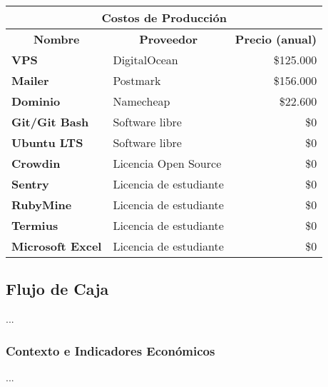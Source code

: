 \begin{center}
	\begin{tabular}{ | l | p{5cm} | p{5cm}|}
		\hline
		\multicolumn{3}{|c|}{\textbf{Costos de Producción}} \\
		\hline
		\multicolumn{1}{|c|}{\textbf{Nombre}} & \multicolumn{1}{|c|}{\textbf{Proveedor}} & \multicolumn{1}{|c|}{\textbf{Precio (anual)}} \\
		\hline
		{\textbf{VPS}} & DigitalOcean & \multicolumn{1}{|r|}{\$125.000} \\ \hline
		
		{\textbf{Mailer}} & Postmark & \multicolumn{1}{|r|}{\$156.000} \\ \hline
		
		{\textbf{Dominio}} & Namecheap & \multicolumn{1}{|r|}{\$22.600} \\ \hline
    
		{\textbf{Git/Git Bash}} & Software libre & \multicolumn{1}{|r|}{\$0} \\ \hline
		
		{\textbf{Ubuntu LTS}} & Software libre & \multicolumn{1}{|r|}{\$0} \\ \hline
    
    	{\textbf{Crowdin}} & Licencia Open Source & \multicolumn{1}{|r|}{\$0} \\ \hline
    
    	{\textbf{Sentry}} & Licencia de estudiante & \multicolumn{1}{|r|}{\$0} \\ \hline

		{\textbf{RubyMine}} & Licencia de estudiante & \multicolumn{1}{|r|}{\$0} \\ \hline
	
		{\textbf{Termius}} & Licencia de estudiante & \multicolumn{1}{|r|}{\$0} \\ \hline
		
      	{\textbf{Microsoft Excel}} & Licencia de estudiante & \multicolumn{1}{|r|}{\$0} \\ \hline
	\end{tabular}

  \label{table:costs:production}
\end{center}

\subsection{Flujo de Caja}
...

\subsubsection{Contexto e Indicadores Económicos}
...

